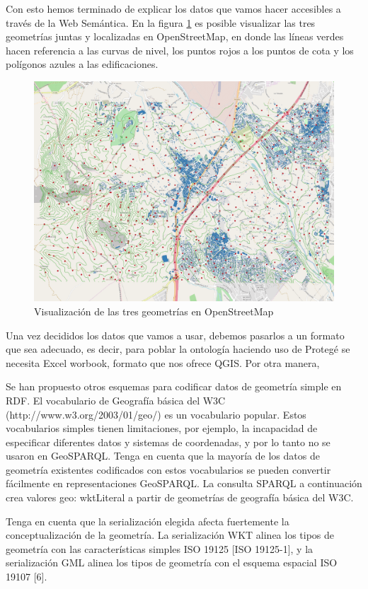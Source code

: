 Con esto hemos terminado de explicar los datos que vamos hacer accesibles a través de la Web Semántica. En la figura \ref{fig:mapa} es posible visualizar las tres geometrías juntas y localizadas en OpenStreetMap, en donde las líneas verdes hacen referencia a las curvas de nivel, los puntos rojos a los puntos de cota y los polígonos azules a las edificaciones.

\begin{figure}[H]
	\centering
	\includegraphics[width=1\linewidth]{imagenes/capitulo4/mapa}
	\caption{Visualización de las tres geometrías en OpenStreetMap}
	\label{fig:mapa}
\end{figure}

Una vez decididos los datos que vamos a usar, debemos pasarlos a un formato que sea adecuado, es decir, para poblar la ontología haciendo uso de Protegé se necesita Excel worbook, formato que nos ofrece QGIS. Por otra manera, 

Se han propuesto otros esquemas para codificar datos de geometría simple en RDF. El vocabulario de Geografía básica del W3C (http://www.w3.org/2003/01/geo/) es un vocabulario popular. Estos vocabularios simples tienen limitaciones, por ejemplo, la incapacidad de especificar diferentes datos y sistemas de coordenadas, y por lo tanto no se usaron en GeoSPARQL. Tenga en cuenta que la mayoría de los datos de geometría existentes codificados con estos vocabularios se pueden convertir fácilmente en representaciones GeoSPARQL. La consulta SPARQL a continuación crea valores geo: wktLiteral a partir de geometrías de geografía básica del W3C.

Tenga en cuenta que la serialización elegida afecta fuertemente la conceptualización de la geometría. La serialización WKT alinea los tipos de geometría con las características simples ISO 19125 [ISO 19125-1], y la serialización GML alinea los tipos de geometría con el esquema espacial ISO 19107 [6].

